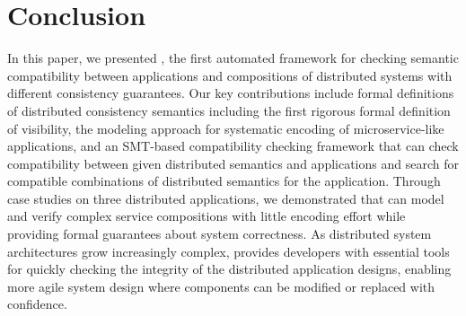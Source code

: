 \section{Conclusion}

In this paper, we presented \sysname{}, the first automated framework
for checking semantic compatibility between applications and
compositions of distributed systems with different consistency
guarantees.  Our key contributions include formal definitions of
distributed consistency semantics including the first rigorous formal
definition of visibility, the \sysgraph{} modeling approach for
systematic encoding of microservice-like applications, and an
SMT-based compatibility checking framework that can check
compatibility between given distributed semantics and applications
and search for compatible combinations of distributed semantics for
the application. Through case studies on three distributed
applications, we demonstrated that \sysname{} can model and verify
complex service compositions with little encoding effort while
providing formal guarantees about system correctness.  As distributed
system architectures grow increasingly complex, \sysname{} provides
developers with essential tools for quickly checking the integrity of
the distributed application designs, enabling more agile system design
where components can be modified or replaced with confidence.
